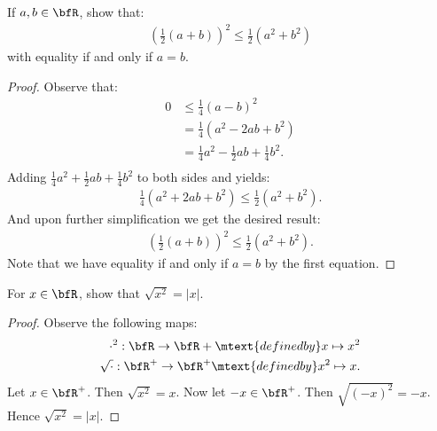 \documentclass[10pt,twoside,openany]{memoir}
\begin{document}
    \begin{exercise}
        If $a,b \in \bfR$, show that:
            \begin{equation*}
            \begin{split}
            \left(\frac{1}{2}(a+b)\right)^2 \leq \frac{1}{2}(a^2 + b^2)
            \end{split}
            \end{equation*}
        with equality if and only if $a = b$.
    \end{exercise}
        \begin{proof}
            Observe that:
                \begin{equation*}
                \begin{split}
                    0
                    &\leq \frac{1}{4}(a-b)^2 \\
                    &= \frac{1}{4}(a^2 - 2ab + b^2) \\
                    &= \frac{1}{4}a^2 - \frac{1}{2}ab + \frac{1}{4}b^2. \\
                \end{split}
                \end{equation*}
            Adding $\frac{1}{4}a^2 + \frac{1}{2}ab + \frac{1}{4}b^2$ to both sides and yields:
                \begin{equation*}
                \begin{split}
                    \frac{1}{4}(a^2 + 2ab + b^2) \leq \frac{1}{2}(a^2 + b^2).
                \end{split}
                \end{equation*}
            And upon further simplification we get the desired result:
                \begin{equation*}
                \begin{split}
                    \left(\frac{1}{2}(a+b)\right)^2 \leq \frac{1}{2}(a^2 + b^2).
                \end{split}
                \end{equation*}
            Note that we have equality if and only if $a=b$ by the first equation.
        \end{proof}
    \begin{exercise}
        For $x \in \bfR$, show that $\sqrt{x^2} = |x|$.
    \end{exercise}
        \begin{proof}
            Observe the following maps:
                \begin{equation*}
                \begin{split}
                    \cdot^2:\bfR \rightarrow \bfR+ \mtext{defined by} x \mapsto x^2 \\
                    \sqrt{\cdot}:\bfR^+ \rightarrow \bfR^+ \mtext{defined by} x^2 \mapsto x.
                \end{split}
                \end{equation*}
            Let $x \in \bfR^+$. Then $\sqrt{x^2} = x$. Now let $-x \in \bfR^+$. Then $\sqrt{(-x)^2} = -x$. Hence $\sqrt{x^2} = |x|$.
        \end{proof}
\end{document}
